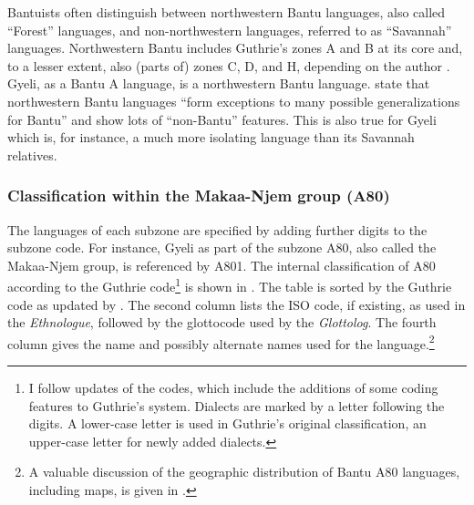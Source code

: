 Bantuists often distinguish between northwestern Bantu languages, also called ``Forest'' languages, and non-northwestern languages, referred to as ``Savannah'' languages. Northwestern Bantu includes Guthrie's zones A and B at its core and, to a lesser extent, also (parts of) zones C, D, and H, depending on the author \citep[10]{nurse08}. Gyeli, as a Bantu A language, is a northwestern Bantu language. \citet[5]{nurse03} state that northwestern Bantu languages ``form exceptions to many possible generalizations for Bantu'' and show lots of ``non-Bantu'' features. This is also true for Gyeli which is, for instance, a much more isolating language than its Savannah relatives.


\subsubsection*{Classification within the Makaa-Njem group (A80)}
The languages of each subzone are specified by adding further digits to the subzone code. For instance, Gyeli as part of the subzone A80, also called the Makaa-Njem group, is referenced by A801. The internal classification of A80 according to the Guthrie code\footnote{I follow  updates of the codes, which include the additions of some coding features to Guthrie's system. Dialects are marked by a letter following the digits. A lower-case letter is used in Guthrie's original classification, an upper-case letter for newly added dialects.} is shown in .  The table is sorted by the Guthrie code as updated by \citet{maho2009}. The second column lists the ISO code, if existing, as used in the {\itshape Ethnologue}, followed by the glottocode used by the {\itshape Glottolog}. The fourth column gives the name and possibly alternate names used for the language.\footnote{A valuable discussion of the geographic distribution of Bantu A80 languages, including maps, is given in \citet{cheucle2014}.}


